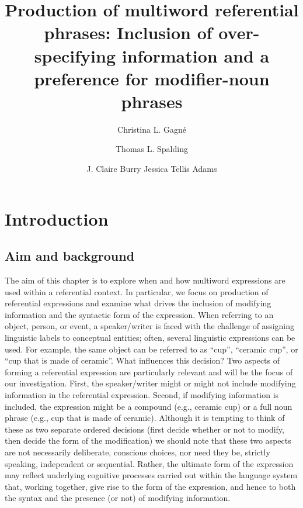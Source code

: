 \documentclass[output=paper]{langsci/langscibook}
\title{Production of multiword referential phrases: Inclusion of
  over-specifying information and a preference for modifier-noun
  phrases}
\author{Christina L. Gagné \affiliation{Department of Psychology, University of Alberta}\and  Thomas L. Spalding \affiliation{Department of Psychology, University of Alberta}\and  J. Claire Burry \affiliation{Department of Psychology, University of Alberta}\lastand  Jessica Tellis Adams\affiliation{KidsAbility Centre for Child Development, Ontario}}
\begin{document}
\maketitle


\section{Introduction}

\subsection{Aim and background}

The aim of this chapter is to explore when and how multiword
expressions are used within a referential context. In particular, we
focus on production of referential expressions and examine what drives
the inclusion of modifying information and the syntactic form of the
expression. When referring to an object, person, or event, a
speaker/writer is faced with the challenge of assigning linguistic
labels to conceptual entities; often, several linguistic expressions
can be used. For example, the same object can be referred to as “cup”,
“ceramic cup”, or “cup that is made of ceramic”. What influences this
decision? Two aspects of forming a referential expression are
particularly relevant and will be the focus of our
investigation. First, the speaker/writer might or might not include
modifying information in the referential expression. Second, if
modifying information is included, the expression might be a compound
(e.g., ceramic cup) or a full noun phrase (e.g., cup that is made of
ceramic). Although it is tempting to think of these as two separate
ordered decisions (first decide whether or not to modify, then decide
the form of the modification) we should note that these two aspects
are not necessarily deliberate, conscious choices, nor need they be,
strictly speaking, independent or sequential. Rather, the ultimate
form of the expression may reflect underlying cognitive processes
carried out within the language system that, working together, give
rise to the form of the expression, and hence to both the syntax and
the presence (or not) of modifying information.
\end{document}
